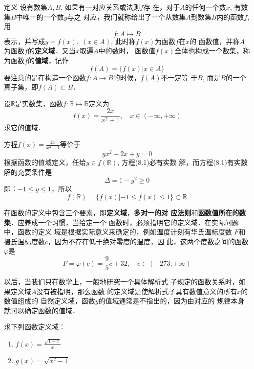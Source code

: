 \begin{blk}{定义}
     设有数集$A,B$, 如果有一对应关系或法则$f$存
在，对于$A$的任何一个数$x$, 有数集$B$中唯一的一个数$y$与之
对应，我们就称给出了一个从数集$A$到数集$B$内的函数$f$, 用
\[f:A\mapsto B\]
表示，并写成$y=f(x),\; (x\in A)$, 此时称$f(x)$为函数$f$在$x$的
函数值，并称$A$为函数$f$的\textbf{定义域}．又当$x$取遍$A$中的数时，
函数值$f(x)$全体也构成一个数集，称为函数$f$的\textbf{值域}，记作
\[f(A)=\{f(x)|x\in A\}\]
要注意的是在构造一个函数$f:A\mapsto B$的时候，$f(A)$不一定等
于$B$, 而是$B$的一个真子集，即$f(A)\subset B$．
\end{blk}



\begin{example}
设$\mathbb{R}$是实数集，函数$f:\mathbb{R}\mapsto\mathbb{R}$定义为
\[f(x)=\frac{2x}{x^2+1},\quad x\in(-\infty,+\infty)\]
求它的值域．
\end{example}

\begin{solution}
    方程$f(x)=\frac{2x}{x^2+1}$等价于
    \begin{equation}
        yx^2-2x+y=0
    \end{equation}
根据函数的值域定义，任给$y\in f(\mathbb{R})$, 方程(8.1)必有实数
解，而方程(8.1)有实数解的充要条件是
\[\Delta=1-y^2\ge 0\]
即：$-1\le y\le 1$，所以
\[f(\mathbb{R})=\{f(x)|-1\le f(x)\le 1\}\subset \mathbb{R}\]
\end{solution}

在函数的定义中包含三个要素，即\textbf{定义域}，\textbf{多对一的对
应法则}和\textbf{函数值所在的数集}．应养成一个习惯，当给定一个
函数时，必须指明它的定义域．在实际问题中，函数的定义
域是根据实际意义来确定的，例如温度计刻有华氏温标度数
$F$和摄氏温标度数$c$，因为不存在低于绝对零度的温度，因
此，这两个度数之间的函数$\varphi$是
\[F=\varphi(c)=\frac{9}{5}c+32,\quad c\in (-273,+\infty)\]

以后，当我们只在数学上，一般地研究一个具体解析式
子规定的函数关系时，如果定义域$A$没有被指明，那么函数
的定义域是使解析式子具有数值意义的所有$x$的数值组成的
自然定义域，函数$y$的值域通常是不指出的，因为由对应的
规律本身就可以确定函数的值域．


\begin{example}
    求下列函数定义域：
\begin{multicols}{2}
\begin{enumerate}
    \item $f(x)=\frac{\sqrt{1-x}}{x}$
    \item $g(x)=\sqrt{x^2-1}$
\end{enumerate}
\end{multicols}
\end{example}

